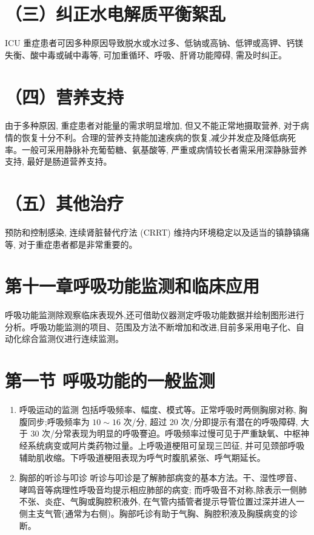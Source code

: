 \documentclass[10pt]{article}
\begin{document}
\section*{（三）纠正水电解质平衡絮乱}
ICU 重症患者可因多种原因导致脱水或水过多、低钠或高钠、低钾或高钾、钙镁失衡、酸中毒或碱中毒等, 可加重循环、呼吸、肝肾功能障碍, 需及时纠正。

\section*{（四）营养支持}
由于多种原因, 重症患者对能量的需求明显增加, 但又不能正常地摄取营养, 对于病情的恢复十分不利。合理的营养支持能加速疾病的恢复,减少并发症及降低病死率。一般可采用静脉补充葡萄糖、氨基酸等, 严重或病情较长者需采用深静脉营养支持, 最好是肠道营养支持。

\section*{（五）其他治疗}
预防和控制感染, 连续肾脏替代疗法 (CRRT) 维持内环境稳定以及适当的镇静镇痛等, 对于重症患者都是非常重要的。

\section*{第十一章呼吸功能监测和临床应用}
呼吸功能监测除观察临床表现外,还可借助仪器测定呼吸功能数据并绘制图形进行分析。呼吸功能监测的项目、范围及方法不断增加和改进,目前多采用电子化、自动化综合监测仪进行连续监测。

\section*{第一节 呼吸功能的一般监测}
\begin{enumerate}
  \item 呼吸运动的监测 包括呼吸频率、幅度、模式等。正常呼吸时两侧胸廓对称, 胸腹同步;呼吸频率为 $10 \sim 16$ 次/分, 超过 20 次/分即提示有潜在的呼吸障碍, 大于 30 次/分常表现为明显的呼吸謇迫。呼吸频率过慢可见于严重缺氧、中枢神经系统病变或阿片类药物过量。上呼吸道梗阻可呈现三凹征, 并可见颈部呼吸辅助肌收缩。下呼吸道梗阻表现为呼气时腹肌紧张、呼气期延长。

  \item 胸部的听诊与叩诊 听诊与叩诊是了解肺部病变的基本方法。干、湿性啰音、哮鸣音等病理性呼吸音均提示相应肺部的病变; 而呼吸音不对称,除表示一侧肺不张、炎症、气胸或胸腔积液外, 在气管内插管者提示导管位置过深并进人一侧主支气管(通常为右侧)。胸部吒诊有助于气胸、胸腔积液及胸膜病变的诊断。

\end{enumerate}
\end{document}
